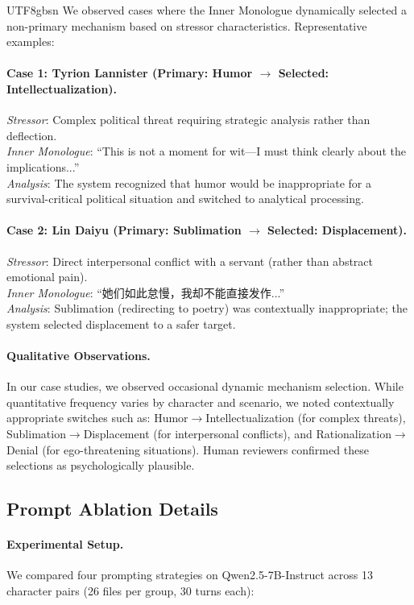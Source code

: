 \documentclass[11pt]{article}
\begin{document}
\begin{CJK*}{UTF8}{gbsn}
We observed cases where the Inner Monologue dynamically selected a non-primary mechanism based on stressor characteristics. Representative examples:

\paragraph{Case 1: Tyrion Lannister (Primary: Humor $\rightarrow$ Selected: Intellectualization).}
\textit{Stressor}: Complex political threat requiring strategic analysis rather than deflection. \\
\textit{Inner Monologue}: ``This is not a moment for wit---I must think clearly about the implications...'' \\
\textit{Analysis}: The system recognized that humor would be inappropriate for a survival-critical political situation and switched to analytical processing.

\paragraph{Case 2: Lin Daiyu (Primary: Sublimation $\rightarrow$ Selected: Displacement).}
\textit{Stressor}: Direct interpersonal conflict with a servant (rather than abstract emotional pain). \\
\textit{Inner Monologue}: ``她们如此怠慢，我却不能直接发作...'' \\
\textit{Analysis}: Sublimation (redirecting to poetry) was contextually inappropriate; the system selected displacement to a safer target.

\paragraph{Qualitative Observations.} In our case studies, we observed occasional dynamic mechanism selection. While quantitative frequency varies by character and scenario, we noted contextually appropriate switches such as: Humor$\rightarrow$Intellectualization (for complex threats), Sublimation$\rightarrow$Displacement (for interpersonal conflicts), and Rationalization$\rightarrow$Denial (for ego-threatening situations). Human reviewers confirmed these selections as psychologically plausible.

\subsection{Prompt Ablation Details}
\label{sec:prompt_ablation_details}

\paragraph{Experimental Setup.} We compared four prompting strategies on Qwen2.5-7B-Instruct across 13 character pairs (26 files per group, 30 turns each):


\end{CJK*}
\end{document}
